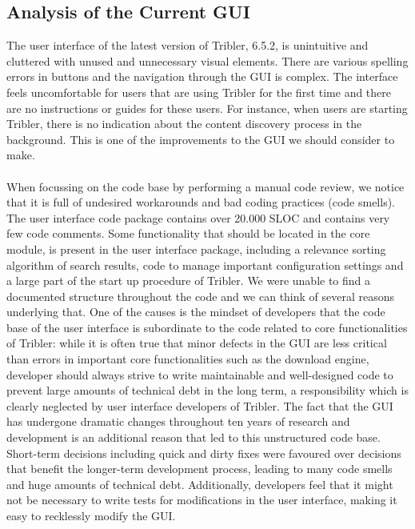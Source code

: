 \subsection{Analysis of the Current GUI}
The user interface of the latest version of Tribler, 6.5.2, is unintuitive and cluttered with unused and unnecessary visual elements. There are various spelling errors in buttons and the navigation through the GUI is complex. The interface feels uncomfortable for users that are using Tribler for the first time and there are no instructions or guides for these users. For instance, when users are starting Tribler, there is no indication about the content discovery process in the background. This is one of the improvements to the GUI we should consider to make.\\\\
When focussing on the code base by performing a manual code review, we notice that it is full of undesired workarounds and bad coding practices (code smells). The user interface code package contains over 20.000 SLOC and contains very few code comments. Some functionality that should be located in the core module, is present in the user interface package, including a relevance sorting algorithm of search results, code to manage important configuration settings and a large part of the start up procedure of Tribler. We were unable to find a documented structure throughout the code and we can think of several reasons underlying that. One of the causes is the mindset of developers that the code base of the user interface is subordinate to the code related to core functionalities of Tribler: while it is often true that minor defects in the GUI are less critical than errors in important core functionalities such as the download engine, developer should always strive to write maintainable and well-designed code to prevent large amounts of technical debt in the long term, a responsibility which is clearly neglected by user interface developers of Tribler. The fact that the GUI has undergone dramatic changes throughout ten years of research and development is an additional reason that led to this unstructured code base. Short-term decisions including quick and dirty fixes were favoured over decisions that benefit the longer-term development process, leading to many code smells and huge amounts of technical debt. Additionally, developers feel that it might not be necessary to write tests for modifications in the user interface, making it easy to recklessly modify the GUI.\\\\
